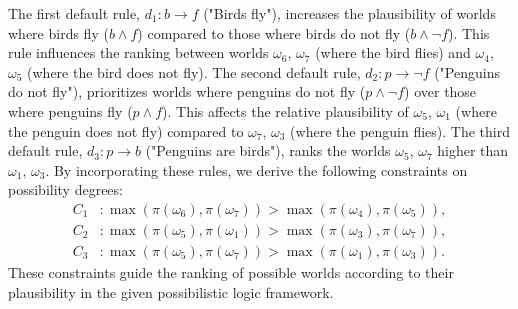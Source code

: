 \documentclass[seminar,english,m]{AIGpaper}
\begin{document}
The first default rule, \( d_1: b \rightarrow f \) ("Birds fly"), increases the plausibility of worlds where birds fly (\( b \land f \)) compared to those where birds do not fly (\( b \land \neg f \)). This rule influences the ranking between worlds \( \omega_6 \), \( \omega_7 \) (where the bird flies) and \( \omega_4 \), \( \omega_5 \) (where the bird does not fly).
The second default rule, \( d_2: p \rightarrow \neg f \) ("Penguins do not fly"), prioritizes worlds where penguins do not fly (\( p \land \neg f \)) over those where penguins fly (\( p \land f \)). This affects the relative plausibility of \( \omega_5 \), \( \omega_1 \) (where the penguin does not fly) compared to \( \omega_7 \), \( \omega_3 \) (where the penguin flies).  
The third default rule, \( d_3: p \rightarrow b \) ("Penguins are birds"), ranks the worlds \( \omega_5 \), \( \omega_7 \) higher than \( \omega_1 \), \( \omega_3 \).
By incorporating these rules, we derive the following constraints on possibility degrees:  
\begin{align*}
	C_1 &: \max(\pi(\omega_6), \pi(\omega_7)) > \max(\pi(\omega_4), \pi(\omega_5)), \\
	C_2 &: \max(\pi(\omega_5), \pi(\omega_1)) > \max(\pi(\omega_3), \pi(\omega_7)), \\
	C_3 &: \max(\pi(\omega_5), \pi(\omega_7)) > \max(\pi(\omega_1), \pi(\omega_3)).
\end{align*}
These constraints guide the ranking of possible worlds according to their plausibility in the given possibilistic logic framework.
\end{document}
